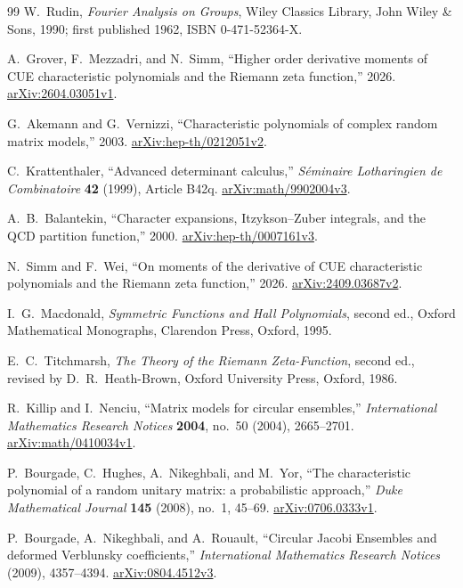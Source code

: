 \begin{thebibliography}{99}
W.~Rudin,
\emph{Fourier Analysis on Groups},
Wiley Classics Library, John Wiley \& Sons, 1990;
first published 1962, ISBN 0-471-52364-X.

A.~Grover, F.~Mezzadri, and N.~Simm,
``Higher order derivative moments of CUE characteristic polynomials and the Riemann zeta
function,'' 2026.
\href{https://arxiv.org/abs/2604.03051v1}{arXiv:2604.03051v1}.

G.~Akemann and G.~Vernizzi,
``Characteristic polynomials of complex random matrix models,'' 2003.
\href{https://arxiv.org/abs/hep-th/0212051v2}{arXiv:hep-th/0212051v2}.

C.~Krattenthaler,
``Advanced determinant calculus,''
\emph{S\'eminaire Lotharingien de Combinatoire} \textbf{42} (1999), Article B42q.
\href{https://arxiv.org/abs/math/9902004v3}{arXiv:math/9902004v3}.

A.~B.~Balantekin,
``Character expansions, Itzykson--Zuber integrals, and the QCD partition function,'' 2000.
\href{https://arxiv.org/abs/hep-th/0007161v3}{arXiv:hep-th/0007161v3}.

N.~Simm and F.~Wei,
``On moments of the derivative of CUE characteristic polynomials and the Riemann zeta
function,'' 2026.
\href{https://arxiv.org/abs/2409.03687v2}{arXiv:2409.03687v2}.

I.~G.~Macdonald,
\emph{Symmetric Functions and Hall Polynomials}, second ed.,
Oxford Mathematical Monographs, Clarendon Press, Oxford, 1995.

E.~C.~Titchmarsh,
\emph{The Theory of the Riemann Zeta-Function}, second ed., revised by D.~R.~Heath-Brown,
Oxford University Press, Oxford, 1986.

R.~Killip and I.~Nenciu,
``Matrix models for circular ensembles,''
\emph{International Mathematics Research Notices} \textbf{2004}, no.~50 (2004),
2665--2701.
\href{https://arxiv.org/abs/math/0410034v1}{arXiv:math/0410034v1}.

P.~Bourgade, C.~Hughes, A.~Nikeghbali, and M.~Yor,
``The characteristic polynomial of a random unitary matrix: a probabilistic approach,''
\emph{Duke Mathematical Journal} \textbf{145} (2008), no.~1, 45--69.
\href{https://arxiv.org/abs/0706.0333v1}{arXiv:0706.0333v1}.

P.~Bourgade, A.~Nikeghbali, and A.~Rouault,
``Circular Jacobi Ensembles and deformed Verblunsky coefficients,''
\emph{International Mathematics Research Notices} (2009), 4357--4394.
\href{https://arxiv.org/abs/0804.4512v3}{arXiv:0804.4512v3}.


\end{thebibliography}
